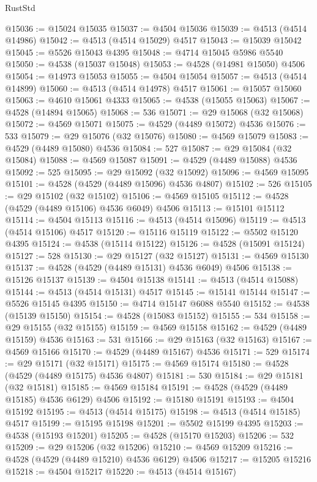 \begin{lexlean}{RustStd}
\begin{coremodule}
@15036 := @15024 @15035
@15037 := @4504 @15036
@15039 := @4513 (@4514 @14986)
@15042 := @4513 (@4514 @15029) @4517
@15043 := @15039 @15042
@15045 := @5526 @15043 @4395
@15048 := @4714 @15045 @5986 @5540
@15050 := @4538 (@15037 @15048)
@15053 := @4528 (@14981 @15050) @4506
@15054 := @14973 @15053
@15055 := @4504 @15054
@15057 := @4513 (@4514 @14899)
@15060 := @4513 (@4514 @14978) @4517
@15061 := @15057 @15060
@15063 := @4610 @15061 @4333
@15065 := @4538 (@15055 @15063)
@15067 := @4528 (@14894 @15065)
@15068 := 536
@15071 := @29 @15068 (@32 @15068)
@15072 := @4569 @15071
@15075 := @4529 (@4489 @15072) @4536
@15076 := 533
@15079 := @29 @15076 (@32 @15076)
@15080 := @4569 @15079
@15083 := @4529 (@4489 @15080) @4536
@15084 := 527
@15087 := @29 @15084 (@32 @15084)
@15088 := @4569 @15087
@15091 := @4529 (@4489 @15088) @4536
@15092 := 525
@15095 := @29 @15092 (@32 @15092)
@15096 := @4569 @15095
@15101 := @4528 (@4529 (@4489 @15096) @4536 @4807)
@15102 := 526
@15105 := @29 @15102 (@32 @15102)
@15106 := @4569 @15105
@15112 := @4528 (@4529 (@4489 @15106) @4536 @6049) @4506
@15113 := @15101 @15112
@15114 := @4504 @15113
@15116 := @4513 (@4514 @15096)
@15119 := @4513 (@4514 @15106) @4517
@15120 := @15116 @15119
@15122 := @5502 @15120 @4395
@15124 := @4538 (@15114 @15122)
@15126 := @4528 (@15091 @15124)
@15127 := 528
@15130 := @29 @15127 (@32 @15127)
@15131 := @4569 @15130
@15137 := @4528 (@4529 (@4489 @15131) @4536 @6049) @4506
@15138 := @15126 @15137
@15139 := @4504 @15138
@15141 := @4513 (@4514 @15088)
@15144 := @4513 (@4514 @15131) @4517
@15145 := @15141 @15144
@15147 := @5526 @15145 @4395
@15150 := @4714 @15147 @6088 @5540
@15152 := @4538 (@15139 @15150)
@15154 := @4528 (@15083 @15152)
@15155 := 534
@15158 := @29 @15155 (@32 @15155)
@15159 := @4569 @15158
@15162 := @4529 (@4489 @15159) @4536
@15163 := 531
@15166 := @29 @15163 (@32 @15163)
@15167 := @4569 @15166
@15170 := @4529 (@4489 @15167) @4536
@15171 := 529
@15174 := @29 @15171 (@32 @15171)
@15175 := @4569 @15174
@15180 := @4528 (@4529 (@4489 @15175) @4536 @4807)
@15181 := 530
@15184 := @29 @15181 (@32 @15181)
@15185 := @4569 @15184
@15191 := @4528 (@4529 (@4489 @15185) @4536 @6129) @4506
@15192 := @15180 @15191
@15193 := @4504 @15192
@15195 := @4513 (@4514 @15175)
@15198 := @4513 (@4514 @15185) @4517
@15199 := @15195 @15198
@15201 := @5502 @15199 @4395
@15203 := @4538 (@15193 @15201)
@15205 := @4528 (@15170 @15203)
@15206 := 532
@15209 := @29 @15206 (@32 @15206)
@15210 := @4569 @15209
@15216 := @4528 (@4529 (@4489 @15210) @4536 @6129) @4506
@15217 := @15205 @15216
@15218 := @4504 @15217
@15220 := @4513 (@4514 @15167)

\end{coremodule}
\end{lexlean}
